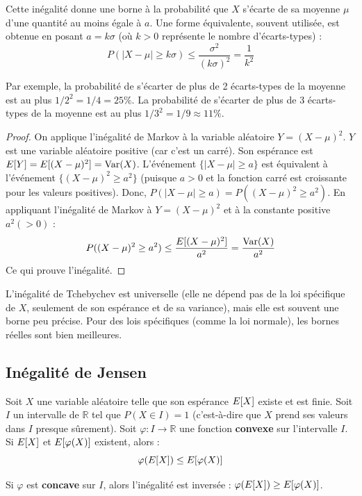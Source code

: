 Cette inégalité donne une borne à la probabilité que $X$ s'écarte de sa moyenne $\mu$ d'une quantité au moins égale à $a$. Une forme équivalente, souvent utilisée, est obtenue en posant $a = k\sigma$ (où $k > 0$ représente le nombre d'écarts-types) :
\[ P(|X - \mu| \ge k\sigma) \le \frac{\sigma^2}{(k\sigma)^2} = \frac{1}{k^2} \]

Par exemple, la probabilité de s'écarter de plus de 2 écarts-types de la moyenne est au plus $1/2^2 = 1/4 = 25\%$. La probabilité de s'écarter de plus de 3 écarts-types de la moyenne est au plus $1/3^2 = 1/9 \approx 11\%$.

\begin{proof}
On applique l'inégalité de Markov à la variable aléatoire $Y = (X - \mu)^2$. $Y$ est une variable aléatoire positive (car c'est un carré). Son espérance est $E[Y] = E[(X - \mu)^2] = \operatorname{Var}(X)$.
L'événement $\{|X - \mu| \ge a\}$ est équivalent à l'événement $\{(X - \mu)^2 \ge a^2\}$ (puisque $a > 0$ et la fonction carré est croissante pour les valeurs positives). Donc, $P(|X - \mu| \ge a) = P((X - \mu)^2 \ge a^2)$.
En appliquant l'inégalité de Markov à $Y = (X - \mu)^2$ et à la constante positive $a^2 (> 0)$ :
\[ P((X - \mu)^2 \ge a^2) \le \frac{E[(X - \mu)^2]}{a^2} = \frac{\operatorname{Var}(X)}{a^2} \]
Ce qui prouve l'inégalité.
\end{proof}

L'inégalité de Tchebychev est universelle (elle ne dépend pas de la loi spécifique de $X$, seulement de son espérance et de sa variance), mais elle est souvent une borne peu précise. Pour des lois spécifiques (comme la loi normale), les bornes réelles sont bien meilleures.

\subsection{Inégalité de Jensen}

Soit $X$ une variable aléatoire telle que son espérance $E[X]$ existe et est finie. Soit $I$ un intervalle de $\mathbb{R}$ tel que $P(X \in I) = 1$ (c'est-à-dire que $X$ prend ses valeurs dans $I$ presque sûrement). Soit $\varphi : I \to \mathbb{R}$ une fonction \textbf{convexe} sur l'intervalle $I$. Si $E[X]$ et $E[\varphi(X)]$ existent, alors :
\[ \varphi(E[X]) \le E[\varphi(X)] \]

Si $\varphi$ est \textbf{concave} sur $I$, alors l'inégalité est inversée : $\varphi(E[X]) \ge E[\varphi(X)]$.

\vspace{1em}

